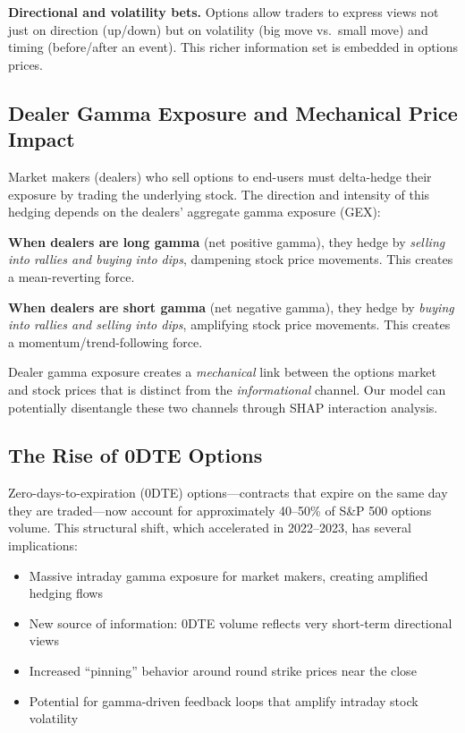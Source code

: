 \documentclass[11pt,a4paper]{article}
\begin{document}
\textbf{Directional and volatility bets.} Options allow traders to express views not just on direction (up/down) but on volatility (big move vs.\ small move) and timing (before/after an event). This richer information set is embedded in options prices.

\subsection{Dealer Gamma Exposure and Mechanical Price Impact}

Market makers (dealers) who sell options to end-users must delta-hedge their exposure by trading the underlying stock. The direction and intensity of this hedging depends on the dealers' aggregate gamma exposure (GEX):

\textbf{When dealers are long gamma} (net positive gamma), they hedge by \emph{selling into rallies and buying into dips}, dampening stock price movements. This creates a mean-reverting force.

\textbf{When dealers are short gamma} (net negative gamma), they hedge by \emph{buying into rallies and selling into dips}, amplifying stock price movements. This creates a momentum/trend-following force.

\begin{keyinsight}
Dealer gamma exposure creates a \emph{mechanical} link between the options market and stock prices that is distinct from the \emph{informational} channel. Our model can potentially disentangle these two channels through SHAP interaction analysis.
\end{keyinsight}

\subsection{The Rise of 0DTE Options}

Zero-days-to-expiration (0DTE) options---contracts that expire on the same day they are traded---now account for approximately 40--50\% of S\&P 500 options volume. This structural shift, which accelerated in 2022--2023, has several implications:

\begin{itemize}[nosep]
    \item Massive intraday gamma exposure for market makers, creating amplified hedging flows
    \item New source of information: 0DTE volume reflects very short-term directional views
    \item Increased ``pinning'' behavior around round strike prices near the close
    \item Potential for gamma-driven feedback loops that amplify intraday stock volatility
\end{itemize}
\end{document}

